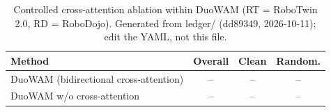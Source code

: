 \begin{table}[t]
  \caption{Controlled cross-attention ablation within DuoWAM (RT = RoboTwin 2.0, RD = RoboDojo). Generated from ledger/ (dd89349, 2026-10-11); edit the YAML, not this file.}
  \label{tab:cross_attention_ablation}
  \centering
  \footnotesize
  \setlength{\tabcolsep}{3pt}
  \renewcommand{\arraystretch}{1.08}
  \begin{tabular*}{\columnwidth}{@{\extracolsep{\fill}}lccc@{}}
    \toprule
    Method & Overall & Clean & Random. \\
    \midrule
    DuoWAM (bidirectional cross-attention) & -- & -- & -- \\
    DuoWAM w/o cross-attention & -- & -- & -- \\
    \bottomrule
  \end{tabular*}
\end{table}
